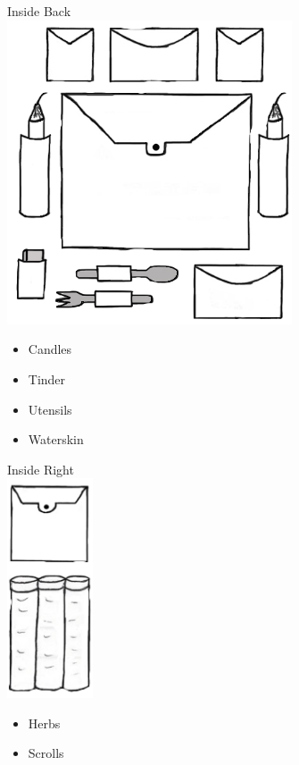 \documentclass[11pt]{article}
\begin{document}
\begin{minipage}[t]{.5\textwidth}
    \normalsize{Inside Back}\\
    \includegraphics[height=9.0cm]{img/CandlesTinder.png}\\
    \begin{normalsize}
        \begin{itemize}[topsep=0pt, itemsep=0pt, partopsep=0pt, parsep=0pt]
            \item Candles
            \item Tinder
            \item Utensils
            \item Waterskin
        \end{itemize}
        \end{normalsize}
\end{minipage}
\begin{minipage}[t]{.248\textwidth}
    \normalsize{Inside Right}\\
    \includegraphics[height=6.5cm]{img/Scrolls-herbs.png}\\
        \begin{itemize}[topsep=0pt, itemsep=0pt, partopsep=0pt, parsep=0pt]
            \item Herbs
            \item Scrolls
        \end{itemize}
\end{minipage}
\end{document}
